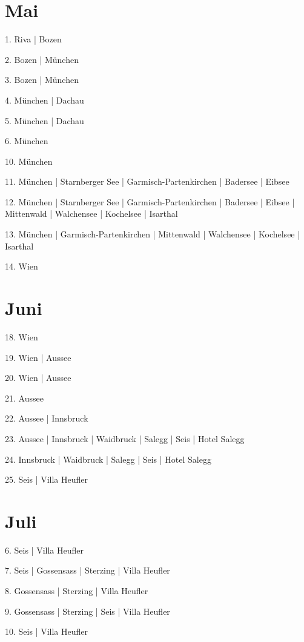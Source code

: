 \documentclass[twoside=false,titlepage=false,open=any, parskip=never, fontsize=10pt, headings=small, chapterprefix=false, appendixprefix=false, DIV=15]{scrbook}
\begin{document}
\begin{multicols}{3}
            \section*{Mai}
            1. Riva | Bozen\par
            2. Bozen | München\par
            3. Bozen | München\par
            4. München | Dachau\par
            5. München | Dachau\par
            6. München\par
            10. München\par
            11. München | Starnberger See | Garmisch-Partenkirchen | Badersee | Eibsee\par
            12. München | Starnberger See | Garmisch-Partenkirchen | Badersee | Eibsee | Mittenwald | Walchensee | Kochelsee | Isarthal\par
            13. München | Garmisch-Partenkirchen | Mittenwald | Walchensee | Kochelsee | Isarthal\par
            14. Wien\par
            \section*{Juni}
            18. Wien\par
            19. Wien | Aussee\par
            20. Wien | Aussee\par
            21. Aussee\par
            22. Aussee | Innsbruck\par
            23. Aussee | Innsbruck | Waidbruck | Salegg | Seis | Hotel Salegg\par
            24. Innsbruck | Waidbruck | Salegg | Seis | Hotel Salegg\par
            25. Seis | Villa Heufler\par
            \section*{Juli}
            6. Seis | Villa Heufler\par
            7. Seis | Gossensass | Sterzing | Villa Heufler\par
            8. Gossensass | Sterzing | Villa Heufler\par
            9. Gossensass | Sterzing | Seis | Villa Heufler\par
            10. Seis | Villa Heufler\par

\end{multicols}
\end{document}
